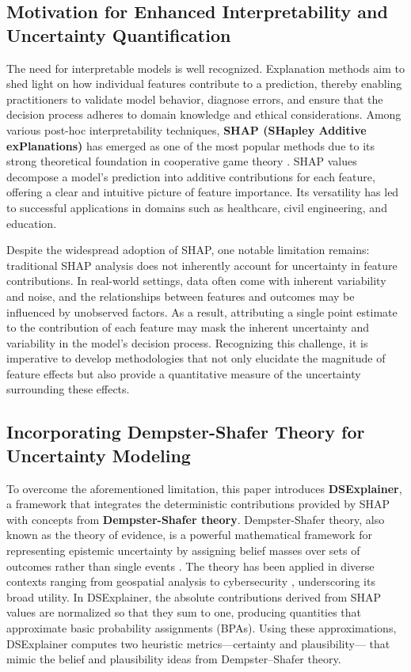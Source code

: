 \documentclass[acmlarge]{acmart}
\begin{document}
\subsection{Motivation for Enhanced Interpretability and Uncertainty Quantification}
The need for interpretable models is well recognized. Explanation methods aim to shed light on how individual features contribute to a prediction, thereby enabling practitioners to validate model behavior, diagnose errors, and ensure that the decision process adheres to domain knowledge and ethical considerations. Among various post-hoc interpretability techniques, \textbf{SHAP (SHapley Additive exPlanations)} has emerged as one of the most popular methods due to its strong theoretical foundation in cooperative game theory \cite{lundberg2017unified}. SHAP values decompose a model's prediction into additive contributions for each feature, offering a clear and intuitive picture of feature importance. Its versatility has led to successful applications in domains such as healthcare\cite{nohara2022explanation,ogami2021artificial}, civil engineering\cite{ekanayake2022novel}, and education\cite{sahlaoui2021predicting}.

Despite the widespread adoption of SHAP, one notable limitation remains: traditional SHAP analysis does not inherently account for uncertainty in feature contributions. In real-world settings, data often come with inherent variability and noise, and the relationships between features and outcomes may be influenced by unobserved factors. As a result, attributing a single point estimate to the contribution of each feature may mask the inherent uncertainty and variability in the model's decision process. Recognizing this challenge, it is imperative to develop methodologies that not only elucidate the magnitude of feature effects but also provide a quantitative measure of the uncertainty surrounding these effects.

\subsection{Incorporating Dempster-Shafer Theory for Uncertainty Modeling}
To overcome the aforementioned limitation, this paper introduces \textbf{DSExplainer}, a framework that integrates the deterministic contributions provided by SHAP with concepts from \textbf{Dempster-Shafer theory}. Dempster-Shafer theory, also known as the theory of evidence, is a powerful mathematical framework for representing epistemic uncertainty by assigning belief masses over sets of outcomes rather than single events \cite{shafer1976mathematical}. The theory has been applied in diverse contexts ranging from geospatial analysis \cite{park2011dempster} to cybersecurity \cite{tian2020deep}, underscoring its broad utility. In DSExplainer, the absolute contributions derived from SHAP values are normalized so that they sum to one, producing quantities that approximate basic probability assignments (BPAs). Using these approximations, DSExplainer computes two heuristic metrics—certainty and plausibility— that mimic the belief and plausibility ideas from Dempster--Shafer theory.
\end{document}
